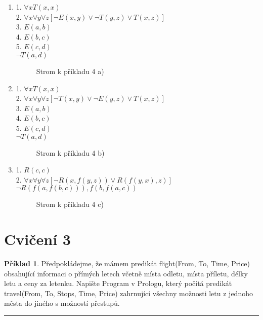 \documentclass[a4paper]{article}
\theoremstyle{definition}
\newtheorem{priklad}{Příklad}
\begin{document}
\begin{enumerate}
    \item 1. $ \forall xT(x,x) $\\
    2. $ \forall x\forall y\forall z\left[\neg E(x,y)\vee \neg T(y,z)\vee T(x,z)\right] $\\
    3. $ E(a,b) $\\
    4. $ E(b,c) $\\
    5. $ E(c,d) $\\
    $ \neg T(a,d) $

    \begin{figure}[htbp]
        \centering
        
        \caption{Strom k příkladu 4 a)}
    \end{figure}

    \item 1. $ \forall xT(x,x) $\\
    2. $ \forall x\forall y\forall z\left[\neg T(x,y)\vee \neg E(y,z)\vee T(x,z)\right] $\\
    3. $ E(a,b) $\\
    4. $ E(b,c) $\\
    5. $ E(c,d) $\\
    $ \neg T(a,d) $

    \begin{figure}[htbp]
        \centering
        
        \caption{Strom k příkladu 4 b)}
    \end{figure}

    \item 1. $ R(c,c) $\\
    2. $ \forall x\forall y\forall z\left[\neg R(x,f(y,z))\vee R(f(y,x),z)\right] $\\
    $ \neg R(f(a,f(b,c))),f(b,f(a,c)) $

    \begin{figure}[htbp]
        \centering
        
        \caption{Strom k příkladu 4 c)}
    \end{figure}
\end{enumerate}

\newpage
\section*{Cvičení 3}
\setcounter{priklad}{0}
\begin{priklad}
    Předpokládejme, že mámem predikát flight(From, To, Time, Price) obsahující informaci o přímých letech včetně místa odletu, místa příletu, délky letu a ceny za letenku. Napište Program v Prologu, který počítá predikát travel(From, To, Stops, Time, Price) zahrnující všechny možnosti letu z jednoho města do jiného s možností přestupů.
    
\noindent\rule{\linewidth}{.2pt}    
\end{priklad}
\end{document}
